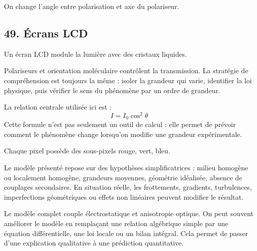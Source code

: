 \documentclass[11pt,a4paper]{article}
\begin{document}
\begin{corrigebox}[Indication]
On change l'angle entre polarisation et axe du polariseur.
\end{corrigebox}


\subsection{49. Écrans LCD}

\begin{exemplebox}
Un écran LCD module la lumière avec des cristaux liquides.
\end{exemplebox}

\begin{methodebox}
Polariseurs et orientation moléculaire contrôlent la transmission.
La stratégie de compréhension est toujours la même : isoler la grandeur qui varie, identifier la loi physique, puis vérifier le sens du phénomène par un ordre de grandeur.
\end{methodebox}

\begin{theorembox}
La relation centrale utilisée ici est :
\[
I=I_0\cos^2\theta
\]
Cette formule n'est pas seulement un outil de calcul : elle permet de prévoir comment le phénomène change lorsqu'on modifie une grandeur expérimentale.
\end{theorembox}

\begin{odgbox}
Chaque pixel possède des sous-pixels rouge, vert, bleu.
\end{odgbox}

\begin{attentionbox}
Le modèle présenté repose sur des hypothèses simplificatrices : milieu homogène ou localement homogène, grandeurs moyennes, géométrie idéalisée, absence de couplages secondaires. En situation réelle, les frottements, gradients, turbulences, imperfections géométriques ou effets non linéaires peuvent modifier le résultat.
\end{attentionbox}

\begin{approfondissementbox}
Le modèle complet couple électrostatique et anisotropie optique.
On peut souvent améliorer le modèle en remplaçant une relation algébrique simple par une équation différentielle, une loi locale ou un bilan intégral. Cela permet de passer d'une explication qualitative à une prédiction quantitative.
\end{approfondissementbox}
\end{document}
